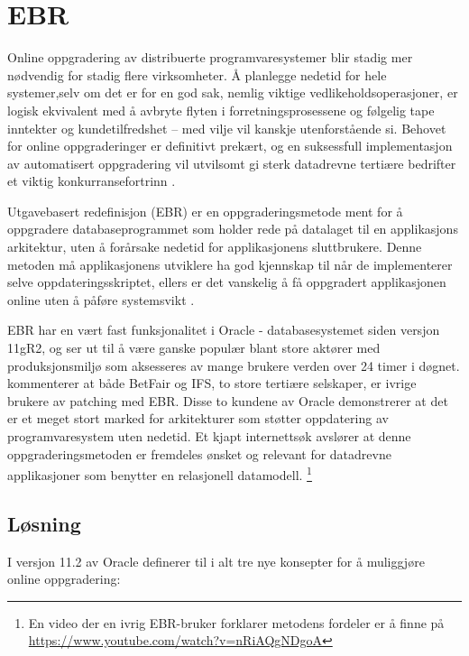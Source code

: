\section{EBR}

Online oppgradering av distribuerte programvaresystemer blir stadig mer nødvendig for stadig flere virksomheter. Å planlegge nedetid for hele systemer,selv om det er for en god sak, nemlig viktige vedlikeholdsoperasjoner, er logisk ekvivalent med å avbryte flyten i forretningsprosessene og følgelig tape inntekter og kundetilfredshet -- med vilje vil kanskje utenforstående si. Behovet for online oppgraderinger er definitivt prekært, og en suksessfull implementasjon av automatisert oppgradering vil utvilsomt gi sterk datadrevne tertiære bedrifter et viktig konkurransefortrinn \citep{choi2009}.

Utgavebasert redefinisjon (EBR) er en oppgraderingsmetode ment for å oppgradere databaseprogrammet som holder rede på datalaget til en applikasjons arkitektur, uten å forårsake nedetid for applikasjonens sluttbrukere. Denne metoden må applikasjonens utviklere ha god kjennskap til når de implementerer selve oppdateringsskriptet, ellers er det vanskelig å få oppgradert applikasjonen online uten å påføre systemsvikt \citep{choi2009}.

EBR har en vært fast funksjonalitet i Oracle - databasesystemet siden versjon 11gR2, og ser ut til å være ganske populær blant store aktører med produksjonsmiljø som aksesseres av mange brukere verden over 24 timer i døgnet. \cite{choi2009} kommenterer at både BetFair og IFS, to store tertiære selskaper, er ivrige brukere av patching med EBR. Disse to kundene av Oracle demonstrerer at det er et meget stort marked for arkitekturer som støtter oppdatering av programvaresystem uten nedetid. Et kjapt internettsøk avslører at denne oppgraderingsmetoden er fremdeles ønsket og relevant for datadrevne applikasjoner som benytter en relasjonell datamodell. \footnote{En video der en ivrig EBR-bruker forklarer metodens fordeler er å finne på \url{https://www.youtube.com/watch?v=nRiAQgNDgoA}}

\subsection{Løsning}
I versjon 11.2 av Oracle definerer \cite{choi2009} til i alt tre nye konsepter for å muliggjøre online oppgradering:

